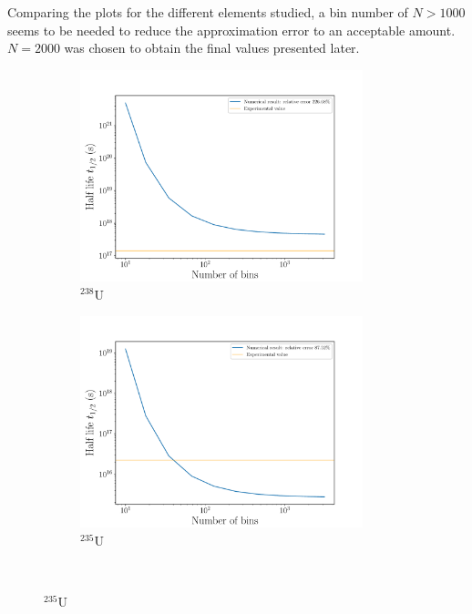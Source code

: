\documentclass[a4paper,DIV=12,english]{scrartcl}
\begin{document}
Comparing the plots for the different elements studied, a bin number of $N > 1000$ seems to be needed to reduce the approximation error to an acceptable amount. $N = 2000$ was chosen to obtain the final values presented later.
\begin{figure}
    \centering
    \begin{subfigure}{0.49\textwidth}
        \centering
        \includegraphics[width=0.9\textwidth]{../plots/bin_dependence/bins_u238.pdf}
        \caption{$^{238}\text{U}$}
        \label{subfig:bins_u238}
    \end{subfigure}
    \begin{subfigure}{0.49\textwidth}
        \centering
        \includegraphics[width=0.9\textwidth]{../plots/bin_dependence/bins_u235.pdf}
        \caption{$^{235}\text{U}$}
        \label{subfig:bins_u235}
    \end{subfigure}\\

\end{figure}
\end{document}
